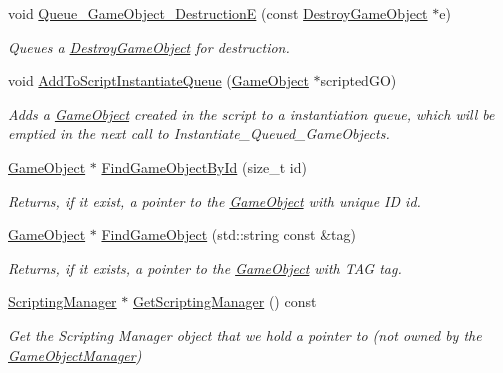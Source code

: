 \begin{DoxyCompactItemize}
void \hyperlink{classGameObjectManager_ac6d00fb01e702114b16784cf71221798}{Queue\+\_\+\+Game\+Object\+\_\+\+DestructionE} (const \hyperlink{classDestroyGameObject}{Destroy\+Game\+Object} $\ast$e)
\begin{DoxyCompactList}\small\item\em Queues a \hyperlink{classDestroyGameObject}{Destroy\+Game\+Object} for destruction. \end{DoxyCompactList}\item 
void \hyperlink{classGameObjectManager_a8520515811ae62ac9c1a086ae2a886f3}{Add\+To\+Script\+Instantiate\+Queue} (\hyperlink{classGameObject}{Game\+Object} $\ast$scripted\+GO)
\begin{DoxyCompactList}\small\item\em Adds a \hyperlink{classGameObject}{Game\+Object} created in the script to a instantiation queue, which will be emptied in the next call to Instantiate\+\_\+\+Queued\+\_\+\+Game\+Objects. \end{DoxyCompactList}\item 
\hyperlink{classGameObject}{Game\+Object} $\ast$ \hyperlink{classGameObjectManager_a7507d2f3f5628774a47528705cf9ed49}{Find\+Game\+Object\+By\+Id} (size\+\_\+t id)
\begin{DoxyCompactList}\small\item\em Returns, if it exist, a pointer to the \hyperlink{classGameObject}{Game\+Object} with unique ID id. \end{DoxyCompactList}\item 
\hyperlink{classGameObject}{Game\+Object} $\ast$ \hyperlink{classGameObjectManager_adeda63433f7f441ad4d48fc4b9758444}{Find\+Game\+Object} (std\+::string const \&tag)
\begin{DoxyCompactList}\small\item\em Returns, if it exists, a pointer to the \hyperlink{classGameObject}{Game\+Object} with T\+AG tag. \end{DoxyCompactList}\item 
\hyperlink{classScriptingManager}{Scripting\+Manager} $\ast$ \hyperlink{classGameObjectManager_a28a54b6450a5e24621dd582d6bee3f1a}{Get\+Scripting\+Manager} () const
\begin{DoxyCompactList}\small\item\em Get the Scripting Manager object that we hold a pointer to (not owned by the \hyperlink{classGameObjectManager}{Game\+Object\+Manager}) \end{DoxyCompactList}\end{DoxyCompactItemize}


